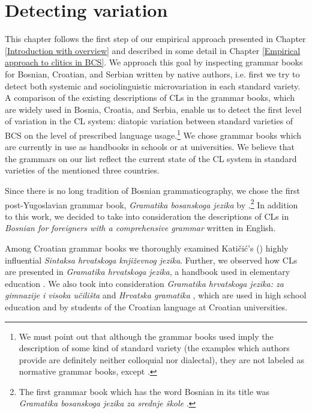 \section{Detecting variation}
\label{Detecting variation}
This chapter follows the first step of our empirical approach presented in Chapter \ref{Introduction with overview} and described in some detail in Chapter \ref{Empirical approach to clitics in BCS}. We approach this goal by inspecting grammar books for Bosnian, Croatian, and Serbian written by native authors, i.e. first we try to detect both systemic and sociolinguistic microvariation in each standard variety. A comparison of the existing descriptions of CLs in the grammar books, which are widely used in Bosnia, Croatia, and Serbia, enable us to detect the first level of variation in the CL system: diatopic variation between standard varieties of BCS on the level of prescribed language usage.\footnote{We must point out that although the grammar books used imply the description of some kind of standard variety (the examples which authors provide are definitely neither colloquial nor dialectal), they are not labeled as normative grammar books, except \citet{PiperKlajn14}.} We chose grammar books which are currently in use as handbooks in schools or at universities. We believe that the grammars on our list reflect the current state of the CL system in standard varieties of the mentioned three countries. 

Since there is no long tradition of Bosnian grammaticography, we chose the first  post-Yugoslavian grammar book, \textit{Gramatika bosanskoga jezika} by \citet{JHP00}.\footnote{The first grammar book which has the word Bosnian in its title was \textit{Gramatika bosanskoga jezika za srednje škole} \citep{Vuletic90}.} In addition to this work, we decided to take into consideration the descriptions of CLs in \textit{Bosnian for foreigners with a comprehensive grammar} \citep{Ridjanovic12} written in English. 

Among Croatian grammar books we thoroughly examined Katičić's (\citeyear{Katicic86}) highly influential \textit{Sintaksa hrvatskoga književnog jezika}. Further, we observed how CLs are presented in \textit{Gramatika hrvatskoga jezika}, a handbook used in elementary education \citep{TezakBabic96}. We also took into consideration \textit{Gramatika hrvatskoga jezika: za gimnazije i visoka učilišta} \citep{SilicPranjkovic07} and \textit{Hrvatska gramatika} \citep{Baric97}, which are used in high school education and by students of the Croatian language at Croatian universities.

